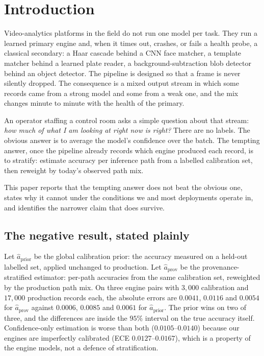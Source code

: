 \documentclass[11pt,a4paper]{article}
\newcommand{\synth}{\textsc{synthetic}}
\begin{document}
\begin{abstract}
All numbers in this paper are produced by behavioural engine models on synthetic
traces with fixed seeds. They are labelled \synth{} throughout and none of them
is a measurement of a production YOLO, FaceNet or PaddleOCR stack.
\end{abstract}

\section{Introduction}

Video-analytics platforms in the field do not run one model per task. They run a
learned primary engine and, when it times out, crashes, or fails a health probe,
a classical secondary: a Haar cascade behind a CNN face matcher, a template
matcher behind a learned plate reader, a background-subtraction blob detector
behind an object detector. The pipeline is designed so that a frame is never
silently dropped. The consequence is a mixed output stream in which some records
came from a strong model and some from a weak one, and the mix changes minute to
minute with the health of the primary.

An operator staffing a control room asks a simple question about that stream:
\emph{how much of what I am looking at right now is right?} There are no labels.
The obvious answer is to average the model's confidence over the batch. The
tempting answer, once the pipeline already records which engine produced each
record, is to stratify: estimate accuracy per inference path from a labelled
calibration set, then reweight by today's observed path mix.

This paper reports that the tempting answer does not beat the obvious one, states
why it cannot under the conditions we and most deployments operate in, and
identifies the narrower claim that does survive.

\subsection{The negative result, stated plainly}

Let $\hat{a}_{\text{prior}}$ be the global calibration prior: the accuracy measured
on a held-out labelled set, applied unchanged to production. Let
$\hat{a}_{\text{prov}}$ be the provenance-stratified estimator: per-path accuracies
from the same calibration set, reweighted by the production path mix. On three
engine pairs with $3{,}000$ calibration and $17{,}000$ production records each,
the absolute errors are $0.0041$, $0.0116$ and $0.0054$ for $\hat{a}_{\text{prov}}$
against $0.0006$, $0.0085$ and $0.0061$ for $\hat{a}_{\text{prior}}$. The prior
wins on two of three, and the differences are inside the $95\%$ interval on the
true accuracy itself. Confidence-only estimation is worse than both
($0.0105$--$0.0140$) because our engines are imperfectly calibrated
(ECE $0.0127$--$0.0167$), which is a property of the engine models, not a defence
of stratification.
\end{document}
